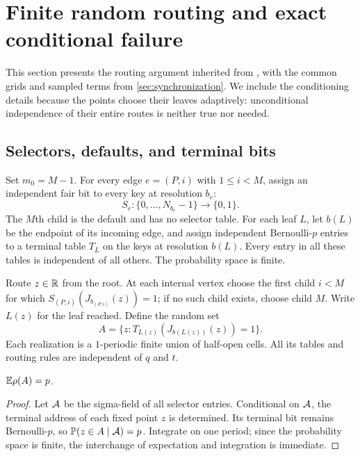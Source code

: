 \section{Finite random routing and exact conditional failure}
\label{sec:routing}

This section presents the routing argument inherited from
\cite[Sections~3--4]{OpenAI84}, with the common grids and sampled terms
from \cref{sec:synchronization}. We include the conditioning details
because the points choose their leaves adaptively: unconditional
independence of their entire routes is neither true nor needed.

\subsection{Selectors, defaults, and terminal bits}

Set $m_0=M-1$. For every edge $e=(P,i)$ with $1\le i<M$, assign an
independent fair bit to every key at resolution $b_e$:
\[
 S_e:\{0,\ldots,N_{b_e}-1\}\longrightarrow\{0,1\}.
\]
The $M$th child is the default and has no selector table. For each
leaf $L$, let $b(L)$ be the endpoint of its incoming edge, and assign
independent Bernoulli-$p$ entries to a terminal table $T_L$ on the
keys at resolution $b(L)$. Every entry in all these tables is
independent of all others. The probability space is finite.

Route $z\in\mathbb R$ from the root. At each internal vertex choose the
first child $i<M$ for which $S_{(P,i)}(J_{b_{(P,i)}}(z))=1$;
if no such child exists, choose child $M$. Write $L(z)$ for the leaf
reached. Define the random set
\begin{equation}\label{eq:random-set}
 A=\{z:T_{L(z)}(J_{b(L(z))}(z))=1\}.
\end{equation}
Each realization is a $1$-periodic finite union of half-open cells.
All its tables and routing rules are independent of $q$ and $t$.

\begin{lemma}\label{lem:mean-density}
$\mathbb E\rho(A)=p$.
\end{lemma}

\begin{proof}
Let $\mathcal A$ be the sigma-field of all selector entries. Conditional
on $\mathcal A$, the terminal address of each fixed point $z$ is determined.
Its terminal bit remains Bernoulli-$p$, so
$\mathbb P(z\in A\mid\mathcal A)=p$. Integrate on one period; since the
probability space is finite, the interchange of expectation and
integration is immediate.
\end{proof}

